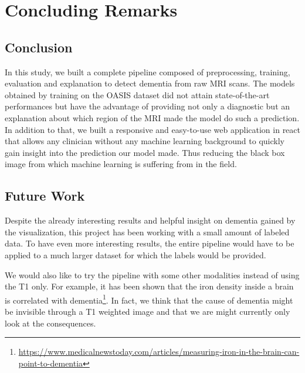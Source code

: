 \chapter{Concluding Remarks}
\label{chap:conculusion}

\section{Conclusion}
In this study, we built a complete pipeline composed of preprocessing, training, evaluation and explanation to detect dementia from raw MRI scans. The models obtained by training on the OASIS dataset did not attain state-of-the-art performances but have the advantage of providing not only a diagnostic but an explanation about which region of the MRI made the model do such a prediction. In addition to that, we built a responsive and easy-to-use web application in react\footnotemark{} that allows any clinician without any machine learning background to quickly gain insight into the prediction our model made. Thus reducing the black box image from which machine learning is suffering from in the field.  

\section{Future Work}
Despite the already interesting results and helpful insight on dementia gained by the visualization, this project has been working with a small amount of labeled data. To have even more interesting results, the entire pipeline would have to be applied to a much larger dataset for which the labels would be provided.

We would also like to try the pipeline with some other modalities instead of using the T1 only. For example, it has been shown that the iron density inside a brain is correlated with dementia\footnote{\href{https://www.medicalnewstoday.com/articles/measuring-iron-in-the-brain-can-point-to-dementia}{https://www.medicalnewstoday.com/articles/measuring-iron-in-the-brain-can-point-to-dementia}}. In fact, we think that the cause of dementia might be invisible through a T1 weighted image and that we are might currently only look at the consequences.